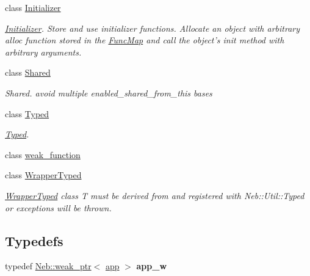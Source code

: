 \begin{DoxyCompactItemize}
class \hyperlink{classNeb_1_1Initializer}{\-Initializer}
\begin{DoxyCompactList}\small\item\em \hyperlink{classNeb_1_1Initializer}{\-Initializer}. \-Store and use initializer functions. \-Allocate an object with arbitrary alloc function stored in the \hyperlink{classNeb_1_1FuncMap}{\-Func\-Map} and call the object's {\ttfamily init} method with arbitrary arguments. \end{DoxyCompactList}\item 
class \hyperlink{classNeb_1_1Shared}{\-Shared}
\begin{DoxyCompactList}\small\item\em \-Shared. avoid multiple enabled\-\_\-shared\-\_\-from\-\_\-this bases \end{DoxyCompactList}\item 
class \hyperlink{classNeb_1_1Typed}{\-Typed}
\begin{DoxyCompactList}\small\item\em \hyperlink{classNeb_1_1Typed}{\-Typed}. \end{DoxyCompactList}\item 
class \hyperlink{classNeb_1_1weak__function}{weak\-\_\-function}
\item 
class \hyperlink{classNeb_1_1WrapperTyped}{\-Wrapper\-Typed}
\begin{DoxyCompactList}\small\item\em \hyperlink{classNeb_1_1WrapperTyped}{\-Wrapper\-Typed} class \-T must be derived from and registered with \-Neb\-::\-Util\-::\-Typed or exceptions will be thrown. \end{DoxyCompactList}\end{DoxyCompactItemize}
\subsection*{\-Typedefs}
\begin{DoxyCompactItemize}
\item 
\hypertarget{namespaceNeb_aa4fcad20cebfd0160ee2d0285a6fc129}{typedef \hyperlink{classNeb_1_1weak__ptr}{\-Neb\-::weak\-\_\-ptr}$<$ \hyperlink{classNeb_1_1app}{app} $>$ {\bfseries app\-\_\-w}}\label{namespaceNeb_aa4fcad20cebfd0160ee2d0285a6fc129}

\end{DoxyCompactItemize}

